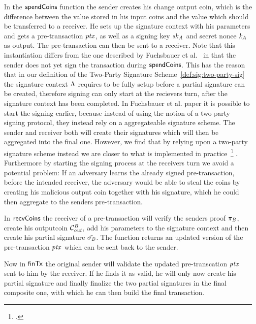 In the $\mathsf{spendCoins}$ function the sender creates his change output coin, which is the difference between the value stored in his input coins and the value which should be transferred to a receiver.
He sets up the signature context with his parameters and gets a pre-transaction $\mathit{ptx}$, as well as a signing key $\mathit{sk}_{\mathit{A}}$ and secret nonce $\mathit{\mathit{k}_{\mathit{A}}}$ as output. The pre-transaction can then be sent to a receiver.
Note that this instantiation differs from the one described by Fuchsbauer et al.~\cite{fuchsbauer2019aggregate} in that the sender does not yet sign the transaction during $\mathsf{spendCoins}$. This has
the reason that in our definition of the Two-Party Signature Scheme~\ref{def:sig:two-party-sig} the signature context $\Lambda$ requires to be fully setup before a partial signature can be created, therefore
signing can only start at the recievers turn, after the signature context has been completed. In Fuchsbauer et al. paper it is possible to start the signing earlier, because instead of using the notion
of a two-party signing protocol, they instead rely on a aggregateable signature scheme. The sender and receiver both will create their signatures which will then be aggregated into the final one. However,
we find that by relying upon a two-party signature scheme instead we are closer to what is implemented in practice~\footcite{https://medium.com/@brandonarvanaghi/grin-transactions-explained-step-by-step-fdceb905a853} .
Furthermore by starting the signing process at the receivers turn we avoid a potential problem: If an adversary learns the already signed pre-transaction, before the
intended receiver, the adversary would be able to steal the coins by creating his malicious output coin together with his signature, which he could then aggregate to the senders pre-transaction.

In $\mathsf{recvCoins}$ the receiver of a pre-transaction will verify the senders proof $\pi_{\mathit{B}}$, create his outputcoin $\mathcal{C}_{\mathit{out}}^{\mathit{B}}$, add his parameters to the signature context and then create his partial signature $\tilde{\sigma_{\mathit{B}}}$.
The function returns an updated version of the pre-transaction $\mathit{ptx}$ which can be sent back to the sender.

Now in $\mathsf{finTx}$ the original sender will validate the updated pre-transcation $\mathit{ptx}$ sent to him by the receiver. If he finds it as valid, he will only now create his partial signature and finally finalize the two partial signatures in the final composite one, with which he can then build the final transaction.

